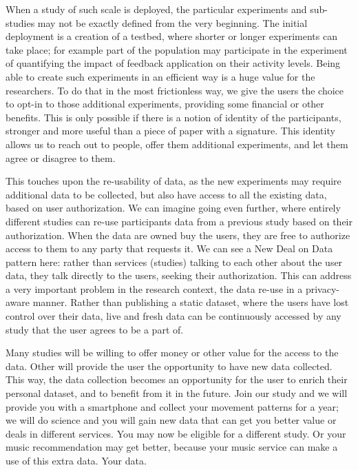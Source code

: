 When a study of such scale is deployed, the particular experiments and sub-studies may not be exactly defined from the very beginning. The initial deployment is a creation of a testbed, where shorter or longer experiments can take place; for example part of the population may participate in the experiment of quantifying the impact of feedback application on their activity levels. Being able to create such experiments in an efficient way is a huge value for the researchers. To do that in the most frictionless way, we give the users the choice to opt-in to those additional experiments, providing some financial or other benefits. This is only possible if there is a notion of identity of the participants, stronger and more useful than a piece of paper with a signature. This identity allows us to reach out to people, offer them additional experiments, and let them agree or disagree to them.

This touches upon the re-usability of data, as the new experiments may require additional data to be collected, but also have access to all the existing data, based on user authorization. We can imagine going even further, where entirely different studies can re-use participants data from a previous study based on their authorization. When the data are owned buy the users, they are free to authorize access to them to any party that requests it. We can see a New Deal on Data pattern here: rather than services (studies) talking to each other about the user data, they talk directly to the users, seeking their authorization. This can address a very important problem in the research context, the data re-use in a privacy-aware manner. Rather than publishing a static dataset, where the users have lost control over their data, live and fresh data can be continuously accessed by any study that the user agrees to be a part of.

Many studies will be willing to offer money or other value for the access to the data. Other will provide the user the opportunity to have new data collected. This way, the data collection becomes an opportunity for the user to enrich their personal dataset, and to benefit from it in the future. Join our study and we will provide you with a smartphone and collect your movement patterns for a year; we will do science and you will gain new data that can get you better value or deals in different services. You may now be eligible for a different study. Or your music recommendation may get better, because your music service can make a use of this extra data. Your data.

